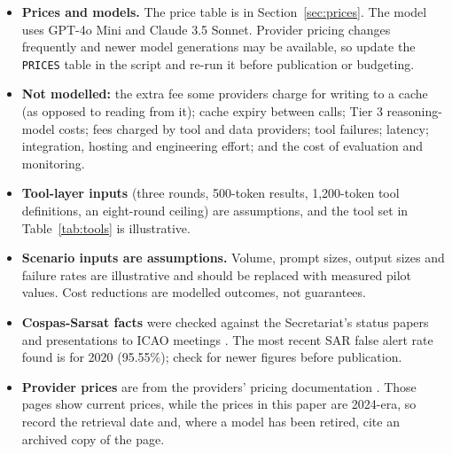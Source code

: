 \documentclass[conference]{IEEEtran}
\begin{document}
\begin{itemize}
\item \textbf{Prices and models.} The price table is in Section~\ref{sec:prices}. The model uses GPT-4o Mini and Claude 3.5 Sonnet. Provider pricing changes frequently and newer model generations may be available, so update the \texttt{PRICES} table in the script and re-run it before publication or budgeting.
\item \textbf{Not modelled:} the extra fee some providers charge for writing to a cache (as opposed to reading from it); cache expiry between calls; Tier 3 reasoning-model costs; fees charged by tool and data providers; tool failures; latency; integration, hosting and engineering effort; and the cost of evaluation and monitoring.
\item \textbf{Tool-layer inputs} (three rounds, 500-token results, 1,200-token tool definitions, an eight-round ceiling) are assumptions, and the tool set in Table~\ref{tab:tools} is illustrative.
\item \textbf{Scenario inputs are assumptions.} Volume, prompt sizes, output sizes and failure rates are illustrative and should be replaced with measured pilot values. Cost reductions are modelled outcomes, not guarantees.
\item \textbf{Cospas-Sarsat facts} were checked against the Secretariat's status papers and presentations to ICAO meetings \cite{wg11,paris,baku,wg10,far,sartf2}. The most recent SAR false alert rate found is for 2020 (95.55\%); check for newer figures before publication.
\item \textbf{Provider prices} are from the providers' pricing documentation \cite{openai,anthropic,google}. Those pages show current prices, while the prices in this paper are 2024-era, so record the retrieval date and, where a model has been retired, cite an archived copy of the page.
\end{itemize}
\end{document}

